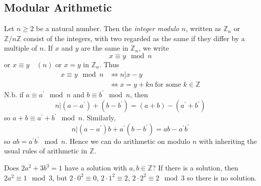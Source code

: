 \documentclass[10pt, a4paper, twoside]{report}
\begin{document}
\subsection{Modular Arithmetic}
Let \(n\geq 2\) be a natural number. Then the \emph{integer modulo \(n\)}, written as \(\mathbb{Z}_n\) or \(\mathbb{Z}/n\mathbb{Z}\) consist of the integers, with two regarded as the same if they differ by a multiple of \(n\). If \(x\) and \(y\) are the same in \(\mathbb{Z}_n\), we write 
\[x\equiv  y\mod n\]
or \(x\equiv y\quad(n)\) or \(x=y\text{  in  }\mathbb{Z}_n\). Thus 
\begin{align*}
    x\equiv y\mod n&\Leftrightarrow n|x-y \\
    &\Leftrightarrow x=y+kn\:\text{for some \(k\in\mathbb{Z}\)}
\end{align*}
N.b. if \(a\equiv a^\prime\mod n\) and \(b\equiv b^\prime\mod n\), then 
\[n|(a-a^\prime)+(b-b^\prime)=(a+b)-(a^\prime+b^\prime)\]
so \(a+b\equiv a^\prime+b^\prime\mod n\). Similarly, 
\[n|(a-a^\prime)b+a^\prime(b-b^\prime)=ab-a^\prime b^\prime\]
so \(ab=a^\prime b^\prime\mod n\). Hence we can do arithmetic on modulo \(n\) with inheriting the usual rules of arithmetic in \(\mathbb{Z}\).
\begin{example}
    Does \(2a^2+3b^3=1\) have a solution with \(a,b\in\mathbb{Z}\)? \newline 
    If there is a solution, then \(2a^2\equiv 1\mod 3\), but \(2\cdot 0^2\equiv 0\), \(2\cdot 1^2\equiv 2\), \(2\cdot 2^2\equiv 2\mod 3\) so there is no solution.
\end{example}
\end{document}
